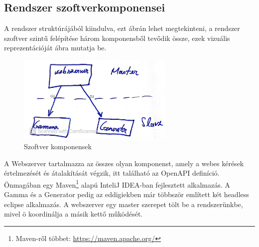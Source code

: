 \subsection{Rendszer szoftverkomponensei}

A rendszer struktúrájából kiindulva, ezt  ábrán lehet megtekinteni, a rendszer szoftver szintű felépítése három komponensből tevődik össze, ezek vizuális reprezentációját  ábra mutatja be.

\begin{figure}[t]
	\centering
	\includegraphics[width=75mm, keepaspectratio]{figures/software_components.jpg}
	\caption{Szoftver komponensek}
	\label{fig:software_components}
\end{figure}

A Webszerver tartalmazza az összes olyan komponenst, amely a webes kérések értelmezését és átalakítását végzik, itt található az OpenAPI definíció. Önmagában egy Maven\footnote{Maven-ről többet: \url{https://maven.apache.org/}} alapú InteliJ IDEA-ban fejlesztett alkalmazás. A Gamma és a Generator pedig az eddigiekben már többször említett két headless eclipse alkalmazás. A webszerver egy master szerepet tölt be a rendszerünkbe, mivel ö koordinálja a másik kettő működését.
